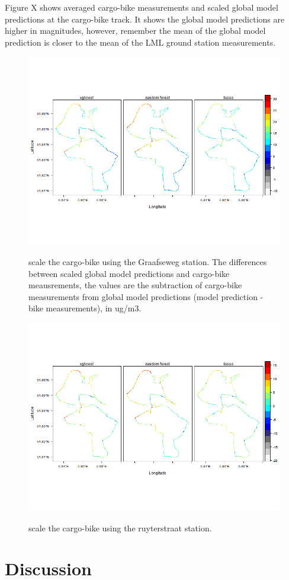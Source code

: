 \documentclass{article}
\begin{document}
Figure X shows averaged cargo-bike measurements and scaled global model predictions at the cargo-bike track. It shows the global model predictions are higher in magnitudes, however, remember the mean of the global model prediction is closer to the mean of the LML ground station measurements. 
\begin{figure}[H]
    \includegraphics[width=\linewidth]{f4a.png}
    \label{Graafseweg}
    \caption {scale the cargo-bike using the Graafseweg station. The differences between scaled global model predictions and cargo-bike meausrements, the values are the subtraction of cargo-bike measurements from global model predictions (model prediction - bike measurements), in ug/m3.}
\end{figure}
\begin{figure}[H]
    \includegraphics[width=\linewidth]{f4b.png}
    \label{ruyterstraat}
    \caption {scale the cargo-bike using the ruyterstraat station.}
\end{figure}

\section{Discussion}
\newpage


\end{document}
